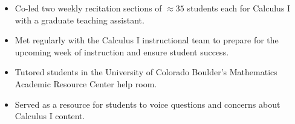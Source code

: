 \documentclass[a4paper,20pt]{article}
\makeatletter
\newcommand{\resumeSubheading}[4]{
  \vspace{-1pt}\item
    \begin{tabular*}{0.97\textwidth}{l@{\extracolsep{\fill}}r}
      \textbf{#1} & #2 \\
      \textit{#3} & \textit{#4} \\
    \end{tabular*}\vspace{-5pt}
}
\makeatother
\begin{document}
    \begin{itemize}
        \itemsep -1pt {}
        \item Co-led two weekly recitation sections of \(\approx 35\) students each for Calculus I with a graduate teaching assistant.
        \item Met regularly with the Calculus I instructional team to prepare for the upcoming week of instruction and ensure student success.
        \item Tutored students in the University of Colorado Boulder's Mathematics Academic Resource Center help room.
        \item Served as a resource for students to voice questions and concerns about Calculus I content.
    \end{itemize}
\end{document}
